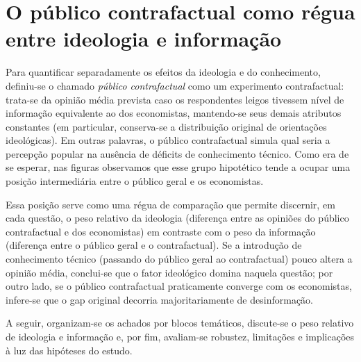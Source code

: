 \section{O público contrafactual como régua entre ideologia e informação} 

Para quantificar separadamente os efeitos da ideologia e do conhecimento, definiu-se o chamado \textit{público contrafactual} como um experimento contrafactual: trata-se da opinião média prevista caso os respondentes leigos tivessem nível de informação equivalente ao dos economistas, mantendo-se seus demais atributos constantes (em particular, conserva-se a distribuição original de orientações ideológicas). Em outras palavras, o público contrafactual simula qual seria a percepção popular na ausência de déficits de conhecimento técnico. Como era de se esperar, nas figuras observamos que esse grupo hipotético tende a ocupar uma posição intermediária entre o público geral e os economistas. 

Essa posição serve como uma régua de comparação que permite discernir, em cada questão, o peso relativo da ideologia (diferença entre as opiniões do público contrafactual e dos economistas) em contraste com o peso da informação (diferença entre o público geral e o contrafactual). Se a introdução de conhecimento técnico (passando do público geral ao contrafactual) pouco altera a opinião média, conclui-se que o fator ideológico domina naquela questão; por outro lado, se o público contrafactual praticamente converge com os economistas, infere-se que o gap original decorria majoritariamente de desinformação. 

A seguir, organizam-se os achados por blocos temáticos, discute-se o peso relativo de ideologia e informação e, por fim, avaliam-se robustez, limitações e implicações à luz das hipóteses do estudo.

